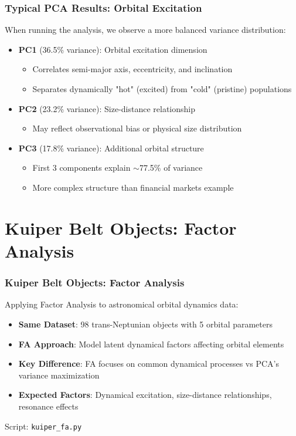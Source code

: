 \documentclass[aspectratio=169]{beamer}
\begin{document}
\begin{frame}
    \frametitle{Typical PCA Results: Orbital Excitation}
    When running the analysis, we observe a more balanced variance distribution:
    \begin{itemize}
        \item \textbf{PC1} (36.5\% variance): Orbital excitation dimension \pause
              \begin{itemize}
                  \item Correlates semi-major axis, eccentricity, and inclination \pause
                  \item Separates dynamically "hot" (excited) from "cold" (pristine) populations \pause
              \end{itemize}
        \item \textbf{PC2} (23.2\% variance): Size-distance relationship \pause
              \begin{itemize}
                  \item May reflect observational bias or physical size distribution \pause
              \end{itemize}
        \item \textbf{PC3} (17.8\% variance): Additional orbital structure \pause
              \begin{itemize}
                  \item First 3 components explain $\sim$77.5\% of variance \pause
                  \item More complex structure than financial markets example \pause
              \end{itemize}
    \end{itemize}
\end{frame}

\section{Kuiper Belt Objects: Factor Analysis}

\begin{frame}
    \frametitle{Kuiper Belt Objects: Factor Analysis}
    Applying Factor Analysis to astronomical orbital dynamics data:
    \begin{itemize}
        \item \textbf{Same Dataset}: 98 trans-Neptunian objects with 5 orbital parameters \pause
        \item \textbf{FA Approach}: Model latent dynamical factors affecting orbital elements \pause
        \item \textbf{Key Difference}: FA focuses on common dynamical processes vs PCA's variance maximization \pause
        \item \textbf{Expected Factors}: Dynamical excitation, size-distance relationships, resonance effects \pause
    \end{itemize}
    \vspace{6pt}
    Script: \texttt{kuiper\_fa.py}
\end{frame}
\end{document}
